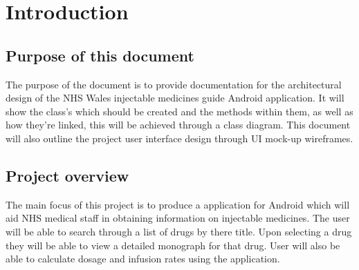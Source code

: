 \documentclass[11pt,fleqn,twoside]{article}
\begin{document}
\wordcount{}

\mmp

\setcounter{tocdepth}{3} %


\section{Introduction}
\subsection{Purpose of this document}
The purpose of the document is to provide documentation for the architectural design of the NHS Wales injectable medicines guide Android application.  It will show the class's which should be created and the methods within them, as well as how they're linked, this will be achieved through a class diagram. This document will also outline the project user interface design through UI mock-up wireframes.


\subsection{Project overview}
The main focus of this project is to produce a application for Android which will aid NHS medical staff in obtaining information on injectable medicines. The user will be able to search through a list of drugs by there title. Upon selecting a drug they will be able to view a detailed monograph for that drug. User will also be able to calculate dosage and infusion rates using the application.
\end{document}
